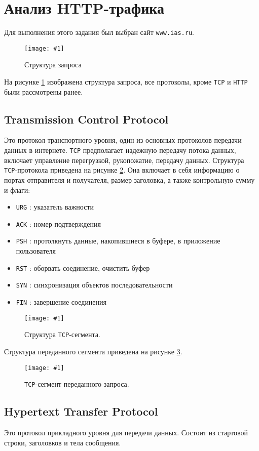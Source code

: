 \documentclass[12pt, a4paper]{article}
\newcommand{\figc}[4]{
  \begin{figure}[H]
  \begin{center}
    \texttt{[image: \#1]}
    \caption{#2}
    \label{fig:#3}
  \end{center}
  \end{figure}
}
\begin{document}
\section{Анализ HTTP-трафика}

Для выполнения этого задания был выбран сайт \texttt{www.ias.ru}.

\figc{http_headers}{Структура запроса}{h_h}{3.0}

На рисунке \ref{fig:h_h} изображена структура запроса, все протоколы, кроме
\texttt{TCP} и \texttt{HTTP} были рассмотрены ранее.

\subsection{Transmission Control Protocol}

Это протокол транспортного уровня, один из основных протоколов передачи данных
в интернете. \texttt{TCP} предполагает надежную передачу потока данных, включает
управление перегрузкой, рукопожатие, передачу данных. Структура \texttt{TCP}-протокола
приведена на рисунке \ref{fig:tcp_s}. Она включает в себя информацию о портах
отправителя и получателя, размер заголовка, а также контрольную сумму и флаги:

\begin{itemize}
  \item \texttt{URG} : указатель важности
  \item \texttt{ACK} : номер подтверждения
  \item \texttt{PSH} : протолкнуть данные, накопившиеся в буфере, в приложение
    пользователя
  \item \texttt{RST} : оборвать соединение, очистить буфер
  \item \texttt{SYN} : синхронизация объектов последовательности
  \item \texttt{FIN} : завершение соединения
\end{itemize}

\figc{tcp_header}{Структура \texttt{TCP}-сегмента.}{tcp_s}{1.7}

Структура переданного сегмента приведена на рисунке \ref{fig:tcp_d}.

\figc{http_tcp}{\texttt{TCP}-сегмент переданного запроса.}{tcp_d}{3.0}

\subsection{Hypertext Transfer Protocol}

Это протокол прикладного уровня для передачи данных. Состоит из стартовой
строки, заголовков и тела сообщения.
\end{document}
